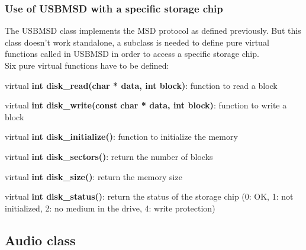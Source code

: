 \documentclass[pdftex,10pt,a4paper]{report}
\newenvironment{packed_item}{
\begin{itemize}
  \setlength{\itemsep}{1pt}
  \setlength{\parskip}{0pt}
  \setlength{\parsep}{0pt}
}{\end{itemize}}
\begin{document}
\subsubsection{Use of USBMSD with a specific storage chip}
The USBMSD class implements the MSD protocol as defined previously. But this class doesn't work standalone, a subclass is needed to define pure virtual functions called in USBMSD in order to access a specific storage chip.\\


Six pure virtual functions have to be defined:
\begin{packed_item}
	\item virtual \textbf{int disk\_read(char * data, int block)}: function to read a block
	\item virtual \textbf{int disk\_write(const char * data, int block)}: function to write a block
	\item virtual \textbf{int disk\_initialize()}: function to initialize the memory
	\item virtual \textbf{int disk\_sectors()}: return the number of blocks
	\item virtual \textbf{int disk\_size()}: return the memory size
	\item virtual \textbf{int disk\_status()}: return the status of the storage chip (0: OK, 1: not initialized, 2: no medium in the drive, 4: write protection)
\end{packed_item}


\subsection{Audio class}
\end{document}
